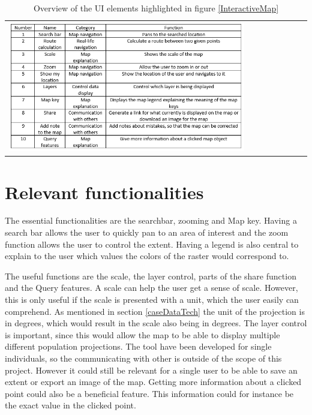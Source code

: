 \begin{table}[h]
	\centering
	\begin{tabular}{l}
		\includegraphics[width=0.8\textwidth]{Pictures/tabOSMFunctions}
	\end{tabular}
	\caption{Overview of the UI elements highlighted in figure \ref{InteractiveMap}}
	\label{tabOSMFunctions}
\end{table}

\section{Relevant functionalities}\label{SortingFunctions}

The essential functionalities are the searchbar, zooming and Map key. 
Having a search bar allows the user to quickly pan to an area of interest and the zoom function allows the user to control the extent. Having a legend is also central to explain to the user which values the colors of the raster would correspond to. 


The useful functions are the scale, the layer control, parts of the share function and the Query features. A scale can help the user get a sense of scale. However, this is only useful if the scale is presented with a unit, which the user easily can comprehend. As mentioned in section \ref{caseDataTech} the unit of the projection is in degrees, which would result in the scale also being in degrees. The layer control is important, since this would allow the map to be able to display multiple different population projections. The tool have been developed for single individuals, so the communicating with other is outside of the scope of this project. However it could still be relevant for a single user to be able to save an extent or export an image of the map. Getting more information about a clicked point could also be a beneficial feature. This information could for instance be the exact value in the clicked point. 

